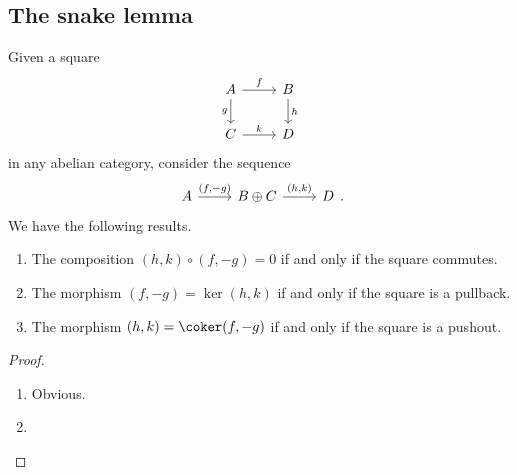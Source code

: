 \documentclass[main.tex]{subfiles}
\begin{document}
\subsection{The snake lemma}
\label{ssc:the_snake_lemma}

\begin{lemma}
  Given a square
  \begin{equation*}
    \begin{tikzcd}
      A
      \arrow[r, "f"]
      \arrow[d, swap, "g"]
      & B
      \arrow[d, "h"]
      \\
      C
      \arrow[r, "k"]
      & D
    \end{tikzcd}
  \end{equation*}
  in any abelian category, consider the sequence
  \begin{equation*}
    \begin{tikzcd}
      A
      \arrow[r, "{(f, -g)}"]
      & B \oplus C
      \arrow[r, "{(h, k)}"]
      & D
    \end{tikzcd}.
  \end{equation*}
  We have the following results.
  \begin{enumerate}
    \item The composition $(h, k) \circ (f, -g) = 0$ if and only if the square commutes.

    \item The morphism $(f, -g) = \ker(h, k)$ if and only if the square is a pullback.

    \item The morphism $(h, k) = \coker(f, -g)$ if and only if the square is a pushout.
  \end{enumerate}
\end{lemma}
\begin{proof}
  \leavevmode
  \begin{enumerate}
    \item Obvious.

    \item 
  \end{enumerate}
\end{proof}
\end{document}
